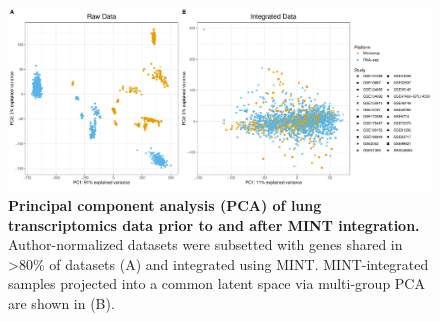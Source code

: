 \documentclass[
]{article}
\begin{document}
\begin{figure}

{\centering \includegraphics[width=1\linewidth,]{./Figures/SysReview/Figure2_PCA} 

}

\caption[MINT integration]{\textbf{Principal component analysis (PCA) of lung transcriptomics data prior to and after MINT integration.} Author-normalized datasets were subsetted with genes shared in \textgreater80\% of datasets (A) and integrated using MINT. MINT-integrated samples projected into a common latent space via multi-group PCA are shown in (B).}\label{fig:integration}
\end{figure}
\end{document}
